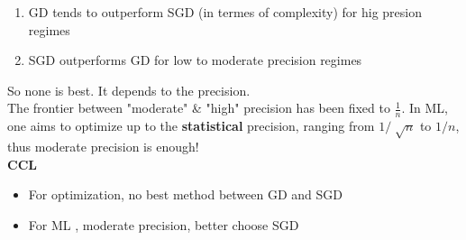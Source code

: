 \begin{note}[]
    \begin{enumerate}
        \item GD tends to outperform SGD (in termes of complexity) for hig presion regimes
        \item SGD outperforms GD for low to moderate precision regimes
    \end{enumerate}
    So none is best. It depends to the precision. \\
    The frontier between "moderate" \& "high" precision has been fixed to $\frac{1}{n}$.
    In ML, one aims to optimize up to the \textbf{statistical} precision, ranging from $ 1 / \sqrt[]{n} $ to $ 1/n $, thus moderate precision is enough! \\
    
    \textbf{CCL}\begin{itemize}
        \item For optimization, no best method between GD and SGD
        \item For ML , moderate precision, better choose SGD
    \end{itemize}


\end{note}
